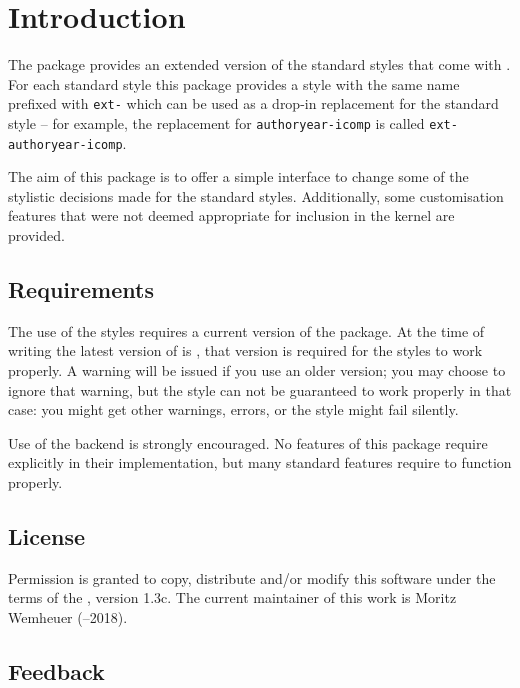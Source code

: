 \documentclass{ltxdockit}
\makeatletter
\newcommand*{\biblatexversion}{\extblx@requiredbiblatexversion}
\newcommand*{\biber}{\sty{biber}}
\makeatother
\begin{document}
\printtitlepage
\tableofcontents


\section{Introduction}\label{sec:int}
The  package provides an extended version of the standard
styles that come with .
For each standard style this package provides a style with the same name
prefixed with \texttt{ext-} which can be used as a drop-in replacement for the
standard style -- for example, the replacement for \texttt{authoryear-icomp}
is called \texttt{ext-authoryear-icomp}.

The aim of this package is to offer a simple interface to change some of the
stylistic decisions made for the standard styles.
Additionally, some customisation features that were not deemed appropriate
for inclusion in the  kernel are provided.

\subsection{Requirements}
The use of the styles requires a current version of the  package.
At the time of writing the latest version of  is \biblatexversion,
that version is required for the styles to work properly.
A warning will be issued if you use an older version; you may choose to ignore
that warning, but the style can not be guaranteed to work properly in that case:
you might get other warnings, errors, or the style might fail silently.

Use of the \biber{} backend is strongly encouraged.
No features of this package require \biber{} explicitly in their implementation,
but many  standard features require \biber{} to function properly.

\subsection{License}
Permission is granted to copy, distribute and\slash or modify this software
under the terms of the \lppl, version 1.3c.%
The current maintainer of this work is Moritz Wemheuer (--2018).


\subsection{Feedback}\label{subsec:int:feb}
\end{document}
